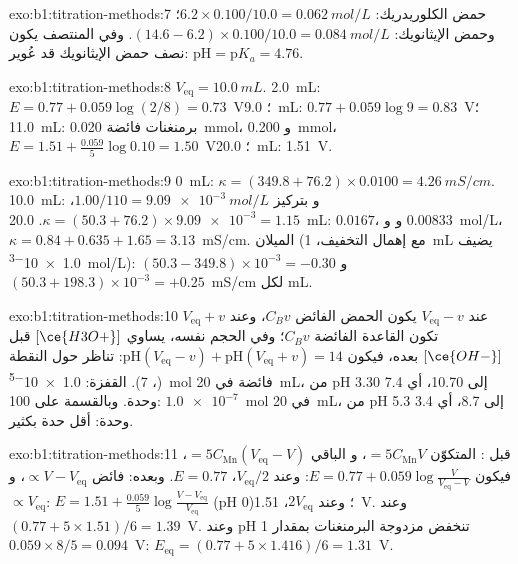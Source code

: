 \begin{solution}{exo:b1:titration-methods:7}
حمض الكلوريدريك: $6.2 \times 0.100/10.0 = \qty{0.062}{mol/L}$؛ وحمض
الإيثانويك: $(14.6 - 6.2) \times 0.100/10.0 = \qty{0.084}{mol/L}$. وفي المنتصف يكون نصف
حمض الإيثانويك قد عُوير: $\mathrm{pH} = \mathrm{p}K_a = 4.76$.
\end{solution}

\begin{solution}{exo:b1:titration-methods:8}
$V_{\mathrm{eq}} = \qty{10.0}{mL}$. 2.0~mL: $E = 0.77 + 0.059\log(2/8) =
0.73$~V؛ 9.0~mL: $0.77 + 0.059\log 9 = 0.83$~V؛ 11.0~mL: برمنغنات
فائضة \qty{0.020}{mmol}، و \qty{0.200}{mmol}، $E = 1.51 +
\frac{0.059}{5}\log 0.10 = 1.50$~V؛ 20.0~mL: 1.51~V.
\end{solution}

\begin{solution}{exo:b1:titration-methods:9}
0~mL: $\kappa = (349.8 + 76.2) \times 0.0100 = \qty{4.26}{mS/cm}$.
10.0~mL:  و بتركيز $1.00/110 = \qty{9.09e-3}{mol/L}$،
$\kappa = (50.3 + 76.2) \times \num{9.09e-3} = 1.15$. 20.0~mL: 
$0.0167$، و و $0.00833$~mol/L، $\kappa = 0.84 + 0.635 + 1.65
= 3.13$~mS/cm. الميلان (مع إهمال التخفيف، \qty{1}{mL} يضيف
\qty{1.0e-3}{mol/L}): $(50.3 - 349.8) \times 10^{-3} = -0.30$
و$(50.3 + 198.3) \times 10^{-3} = +0.25$~mS/cm لكل mL.
\end{solution}

\begin{solution}{exo:b1:titration-methods:10}
عند $V_{\mathrm{eq}} - v$ يكون الحمض الفائض $C_Bv$، وعند $V_{\mathrm{eq}} + v$
تكون القاعدة الفائضة $C_Bv$؛ وفي الحجم نفسه، يساوي $[\ce{H3O+}]$ قبل 
$[\ce{OH-}]$ بعده، فيكون $\mathrm{pH}(V_{\mathrm{eq}} - v) +
\mathrm{pH}(V_{\mathrm{eq}} + v) = 14$: تناظر حول النقطة (،
7). القفزة: \qty{1.0e-5}{mol} فائضة في \qty{20}{mL}، من pH 3.30 إلى 10.70، أي 7.4
وحدة. وبالقسمة على 100: $\num{1.0e-7}$~mol في \qty{20}{mL}، من pH 5.3 إلى 8.7،
أي 3.4 وحدة:  أقل حدة بكثير.
\end{solution}

\begin{solution}{exo:b1:titration-methods:11}
قبل :  المتكوّن $= 5C_{\mathrm{Mn}}V$، و الباقي $=
5C_{\mathrm{Mn}}(V_{\mathrm{eq}} - V)$، فيكون $E = 0.77 + 0.059\log\frac{V}{V_{\mathrm{eq}}
- V}$: وعند $V_{\mathrm{eq}}/2$، $E = 0.77$. وبعده: فائض  $\propto
V - V_{\mathrm{eq}}$، و $\propto V_{\mathrm{eq}}$: $E = 1.51 +
\frac{0.059}{5}\log\frac{V - V_{\mathrm{eq}}}{V_{\mathrm{eq}}}$ (pH 0)؛ وعند
$2V_{\mathrm{eq}}$، 1.51~V. وعند  $(0.77 + 5 \times 1.51)/6 =
1.39$~V. وعند pH 1 تنخفض مزدوجة البرمنغنات بمقدار $0.059 \times 8/5 =
0.094$~V: $E_{\mathrm{eq}} = (0.77 + 5 \times 1.416)/6 = 1.31$~V.
\end{solution}

